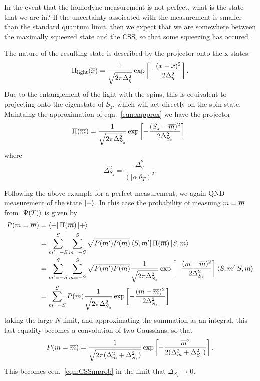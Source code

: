 In the event that the homodyne measurement is not perfect, what is the state
that we are in? If the uncertainty assoicated with the measurement is smaller
than the standard quantum limit, then we expect that we are somewhere between
the maximally squeezed state and the CSS, so that some squeezing has
occured.

The nature of the resulting state is described by the
projector onto the x states:~\cite{Cox2016, Zhang2019}
%
\begin{equation}
  \Pi_\text{light}(\overline{x}) = \frac{1}{\sqrt{2\pi\Delta_\eta^2}}\exp\left[
    -\frac{(x-\overline{x})^2}{2\Delta_\eta^2}\right].
\end{equation}
%
Due to the entanglement of the light with the spins, this is equivalent to
projecting onto the eigenstate of $S_z$, which will act directly on the spin
state. Maintaing the approximation of
eqn.~\ref{eqn:xapprox}
we have the projector
%
\begin{equation}
  \Pi(\overline{m}) = \frac{1}{\sqrt{2\pi\Delta_{S_z}^2}}\exp\left[
    -\frac{(S_z-\overline{m})^2}{2\Delta_{S_z}^2}\right].
\end{equation}
%
where
%
\begin{equation}
  \Delta_{S_z}^2 = \frac{\Delta_\eta^2}{(|\alpha|\theta_T)^2}.
\end{equation}

Following the above example for a perfect measurement, we again QND measurement
of the state $\ket{+}$. In this case the probability of measuing $m=\overline{m}$
from $\ket{\Psi(T)}$ is given by~\cite{}
%
\begin{align}
  P(m=\overline{m}) &= \bra{+}\Pi(\overline{m})\ket{+}\\
  & = \sum_{m'=-S}^S \sum_{m=-S}^S \sqrt{P(m')P(m)}\bra{S,
  m'}\Pi(\overline{m})\ket{S, m} \\
  & = \sum_{m'=-S}^S \sum_{m=-S}^S \sqrt{P(m')P(m)}
  \frac{1}{\sqrt{2\pi\Delta_{S_z}^2}}\exp\left[-\frac{(m-\overline{m})^2}{2\Delta_{S_z}^2}\right] 
  \bra{S, m'}\ket{S, m} \\
  &= \sum_{m=-S}^{S} P(m) 
  \frac{1}{\sqrt{2\pi\Delta_{S_z}^2}}\exp\left[-\frac{(m-\overline{m})^2}{2\Delta_{S_z}^2}\right] 
\end{align}
%
taking the large $N$ limit, and approximating the summation as an integral,
this last equality becomes a convolution of two Gaussians, so that
%
\begin{equation}
  P(m=\overline{m}) = \frac{1}{\sqrt{2\pi(\Delta_m^2 + \Delta_{S_z}^2)}}\exp\left[
    -\frac{\overline{m}^2}{2(\Delta_m^2 + \Delta_{S_z}^2)}\right].
\end{equation}
%
This becomes eqn.~\ref{eqn:CSSmprob} in the limit that $\Delta_{S_z} \to 0$.

